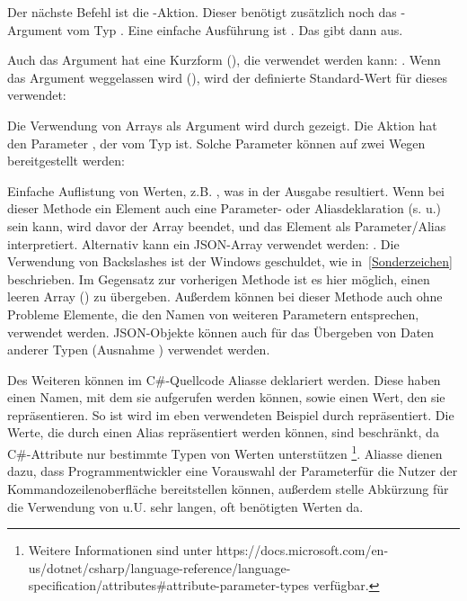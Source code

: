 Der nächste Befehl ist die -Aktion.
Dieser benötigt zusätzlich noch das -Argument vom Typ .
Eine einfache Ausführung ist .
Das gibt dann  aus.

Auch das Argument hat eine Kurzform (), die verwendet werden kann: .
Wenn das Argument weggelassen wird (), wird der definierte Standard-Wert für dieses verwendet:

Die Verwendung von Arrays als Argument wird durch  gezeigt.
Die Aktion hat den Parameter , der vom Typ  ist.
Solche Parameter können auf zwei Wegen bereitgestellt werden:
\begin{outline}
 \1 Einfache Auflistung von Werten, z.B. ,
 was in der Ausgabe  resultiert.
 Wenn bei dieser Methode ein Element auch eine Parameter- oder Aliasdeklaration (s. u.) sein kann, wird davor der Array beendet,
 und das Element als Parameter/Alias interpretiert.
 \1 Alternativ kann ein JSON-Array verwendet werden: .
 Die Verwendung von Backslashes ist der Windows  geschuldet, wie in~\ref{Sonderzeichen} beschrieben.
 Im Gegensatz zur vorherigen Methode ist es hier möglich, einen leeren Array (\inlinecode{[]}) zu übergeben.
 Außerdem können bei dieser Methode auch ohne Probleme Elemente, die den Namen von weiteren Parametern entsprechen, verwendet werden.
 JSON-Objekte können auch für das \"Ubergeben von Daten anderer Typen (Ausnahme ) verwendet werden.
\end{outline}

Des Weiteren können im C\#-Quellcode Aliasse deklariert werden.
Diese haben einen Namen, mit dem sie aufgerufen werden können, sowie einen Wert, den sie repräsentieren.
So ist wird im eben verwendeten Beispiel  durch  repräsentiert.
Die Werte, die durch einen Alias repräsentiert werden können, sind beschränkt, da C\#-Attribute nur bestimmte Typen von Werten unterstützen
\footnote{Weitere Informationen sind unter https://docs.microsoft.com/en-us/dotnet/csharp/language-reference/language-specification/attributes\#attribute-parameter-types verfügbar.}.
Aliasse dienen dazu, dass Programmentwickler eine Vorauswahl der Parameterfür die Nutzer der Kommandozeilenoberfläche bereitstellen können,
außerdem stelle Abkürzung für die Verwendung von u.U. sehr langen, oft benötigten Werten da.

